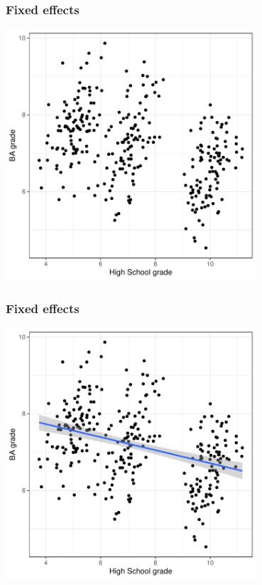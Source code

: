 \documentclass[aspectratio=43]{beamer}
\begin{document}
\begin{frame}
\frametitle{Fixed effects}
\centering

\includegraphics[width = 0.7\textwidth]{../img/fe1}

\end{frame}

\begin{frame}
\frametitle{Fixed effects}
\centering

\includegraphics[width = 0.7\textwidth]{../img/fe2}

\end{frame}
\end{document}
